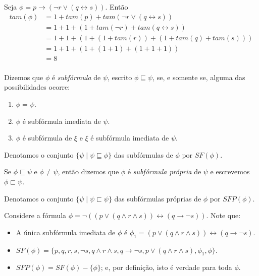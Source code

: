 \begin{example}
	Seja $\phi = p \rightarrow (\neg r \vee (q \leftrightarrow s))$. Então
	\begin{equation*}
	\begin{split}
	tam(\phi) & = 1 + tam(p) + tam(\neg r \vee (q \leftrightarrow s))\\
	& = 1 + 1 + (1 + tam(\neg r) + tam(q \leftrightarrow s))\\
	& = 1 + 1 + (1 + (1 + tam(r)) + (1 + tam(q) + tam(s)))\\
	& = 1 + 1 + (1 + (1 + 1) + (1 + 1 + 1))\\
	& = 8\\
	\end{split}
	\end{equation*}
\end{example}

\begin{definition}
	Dizemos que $\phi$ é \emph{subfórmula} de $\psi$, escrito $\phi \sqsubseteq \psi$, se, e somente se, alguma das possibilidades ocorre:
	\begin{enumerate}
		\item $\phi = \psi$.
		\item $\phi$ é subfórmula imediata de $\psi$.
		\item $\phi$ é subfórmula de $\xi$ e $\xi$ é subfórmula imediata de $\psi$.
	\end{enumerate}
	
	Denotamos o conjunto $\{\psi \mid \psi \sqsubseteq \phi \}$ das subfórmulas de $\phi$ por $SF(\phi)$.
	
	Se $\phi \sqsubseteq \psi$ e $\phi \neq \psi$, então dizemos que $\phi$ é \emph{subfórmula própria} de $\psi$ e escrevemos $\phi \sqsubset \psi$.
	
	Denotamos o conjunto $\{\psi \mid \psi \sqsubset \psi \}$ das subfórmulas próprias de $\phi$ por $SFP(\phi)$.
\end{definition}

\begin{example}
	Considere a fórmula $\phi = \neg((p \vee (q \wedge r \wedge s)) \leftrightarrow (q \rightarrow \neg s))$. Note que:
	\begin{itemize}
		\item A única subfórmula imediata de $\phi$ é $\phi_1 = (p \vee (q \wedge r \wedge s)) \leftrightarrow (q \rightarrow \neg s)$.
		\item $SF(\phi) = \{p,q,r,s,\neg s,q \wedge r \wedge s,q \rightarrow \neg s,p \vee (q \wedge r \wedge s),\phi_1,\phi \}$.
		\item $SFP(\phi) = SF(\phi) - \{\phi \}$; e, por definição, isto é verdade para toda $\phi$.
	\end{itemize}
\end{example}

